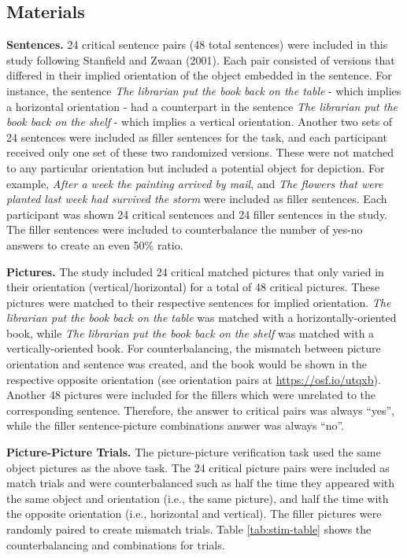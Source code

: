\documentclass[
  man,floatsintext]{apa7}
\begin{document}
\hypertarget{materials}{%
\subsection{Materials}\label{materials}}

\textbf{Sentences.} 24 critical sentence pairs (48 total sentences) were
included in this study following Stanfield and Zwaan (2001). Each pair
consisted of versions that differed in their implied orientation of the
object embedded in the sentence. For instance, the sentence \emph{The
librarian put the book back on the table} - which implies a horizontal
orientation - had a counterpart in the sentence \emph{The librarian put the
book back on the shelf} - which implies a vertical orientation. Another
two sets of 24 sentences were included as filler sentences for the task,
and each participant received only one set of these two randomized
versions. These were not matched to any particular orientation but
included a potential object for depiction. For example, \emph{After a week
the painting arrived by mail}, and \emph{The flowers that were planted last
week had survived the storm} were included as filler sentences. Each
participant was shown 24 critical sentences and 24 filler sentences in
the study. The filler sentences were included to counterbalance the
number of yes-no answers to create an even 50\% ratio.

\textbf{Pictures.} The study included 24 critical matched pictures that only
varied in their orientation (vertical/horizontal) for a total of 48
critical pictures. These pictures were matched to their respective
sentences for implied orientation. \emph{The librarian put the book back on
the table} was matched with a horizontally-oriented book, while \emph{The
librarian put the book back on the shelf} was matched with a
vertically-oriented book. For counterbalancing, the mismatch between
picture orientation and sentence was created, and the book would be
shown in the respective opposite orientation (see orientation pairs at
\url{https://osf.io/utqxb}). Another 48 pictures were included for the
fillers which were unrelated to the corresponding sentence. Therefore,
the answer to critical pairs was always ``yes'', while the filler
sentence-picture combinations answer was always ``no''.

\textbf{Picture-Picture Trials.} The picture-picture verification task used
the same object pictures as the above task. The 24 critical picture
pairs were included as match trials and were counterbalanced such as
half the time they appeared with the same object and orientation (i.e.,
the same picture), and half the time with the opposite orientation
(i.e., horizontal and vertical). The filler pictures were randomly
paired to create mismatch trials. Table \ref{tab:stim-table} shows the
counterbalancing and combinations for trials.
\end{document}
